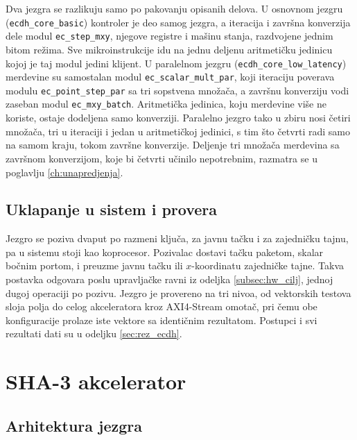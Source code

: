 Dva jezgra se razlikuju samo po pakovanju opisanih delova. U osnovnom jezgru (\texttt{ecdh\_core\_basic}) kontroler je deo samog jezgra, a iteracija i završna konverzija dele modul \texttt{ec\_step\_mxy}, njegove registre i mašinu stanja, razdvojene jednim bitom režima. Sve mikroinstrukcije idu na jednu deljenu aritmetičku jedinicu kojoj je taj modul jedini klijent.
\smallbreak
U paralelnom jezgru (\texttt{ecdh\_core\_low\_latency}) merdevine su samostalan modul \texttt{ec\_scalar\_mult\_par}, koji iteraciju poverava modulu \texttt{ec\_point\_step\_par} sa tri sopstvena množača, a završnu konverziju vodi zaseban modul \texttt{ec\_mxy\_batch}. Aritmetička jedinica, koju merdevine više ne koriste, ostaje dodeljena samo konverziji. Paralelno jezgro tako u zbiru nosi četiri množača, tri u iteraciji i jedan u aritmetičkoj jedinici, s tim što četvrti radi samo na samom kraju, tokom završne konverzije. Deljenje tri množača merdevina sa završnom konverzijom, koje bi četvrti učinilo nepotrebnim, razmatra se u poglavlju \ref{ch:unapredjenja}.

\subsection{Uklapanje u sistem i provera}
\label{subsec:hw_ecdh_uklapanje}

Jezgro se poziva dvaput po razmeni ključa, za javnu tačku i za zajedničku tajnu, pa u sistemu stoji kao koprocesor. Pozivalac dostavi tačku paketom, skalar bočnim portom, i preuzme javnu tačku ili $x$-koordinatu zajedničke tajne. Takva postavka odgovara poslu upravljačke ravni iz odeljka \ref{subsec:hw_cilj}, jednoj dugoj operaciji po pozivu.
\smallbreak
Jezgro je provereno na tri nivoa, od vektorskih testova sloja polja do celog akceleratora kroz AXI4-Stream omotač, pri čemu obe konfiguracije prolaze iste vektore sa identičnim rezultatom. Postupci i svi rezultati dati su u odeljku \ref{sec:rez_ecdh}.

\section{SHA-3 akcelerator}
\label{sec:hw_sha3}

\subsection{Arhitektura jezgra}
\label{subsec:hw_sha3_arh}

